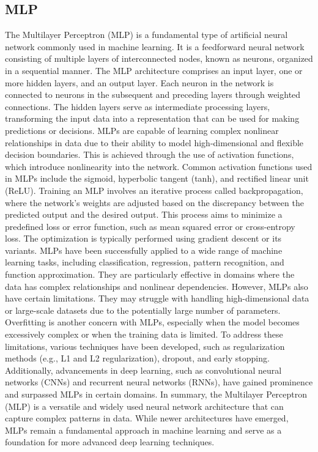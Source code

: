 \subsection{MLP}
The Multilayer Perceptron (MLP) is a fundamental type of artificial neural network commonly used in machine learning. It is a feedforward neural network consisting of multiple layers of interconnected nodes, known as neurons, organized in a sequential manner.
The MLP architecture comprises an input layer, one or more hidden layers, and an output layer. Each neuron in the network is connected to neurons in the subsequent and preceding layers through weighted connections. The hidden layers serve as intermediate processing layers, transforming the input data into a representation that can be used for making predictions or decisions.
MLPs are capable of learning complex nonlinear relationships in data due to their ability to model high-dimensional and flexible decision boundaries. This is achieved through the use of activation functions, which introduce nonlinearity into the network. Common activation functions used in MLPs include the sigmoid, hyperbolic tangent (tanh), and rectified linear unit (ReLU).
Training an MLP involves an iterative process called backpropagation, where the network's weights are adjusted based on the discrepancy between the predicted output and the desired output. This process aims to minimize a predefined loss or error function, such as mean squared error or cross-entropy loss. The optimization is typically performed using gradient descent or its variants.
MLPs have been successfully applied to a wide range of machine learning tasks, including classification, regression, pattern recognition, and function approximation. They are particularly effective in domains where the data has complex relationships and nonlinear dependencies.
However, MLPs also have certain limitations. They may struggle with handling high-dimensional data or large-scale datasets due to the potentially large number of parameters. Overfitting is another concern with MLPs, especially when the model becomes excessively complex or when the training data is limited.
To address these limitations, various techniques have been developed, such as regularization methods (e.g., L1 and L2 regularization), dropout, and early stopping. Additionally, advancements in deep learning, such as convolutional neural networks (CNNs) and recurrent neural networks (RNNs), have gained prominence and surpassed MLPs in certain domains.
In summary, the Multilayer Perceptron (MLP) is a versatile and widely used neural network architecture that can capture complex patterns in data. While newer architectures have emerged, MLPs remain a fundamental approach in machine learning and serve as a foundation for more advanced deep learning techniques.

